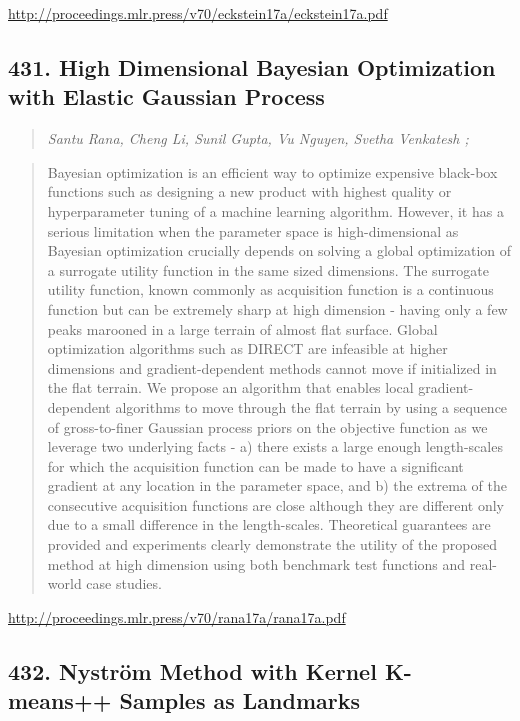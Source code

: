 \documentclass{article}
\begin{document}
\href{http://proceedings.mlr.press/v70/eckstein17a/eckstein17a.pdf}{http://proceedings.mlr.press/v70/eckstein17a/eckstein17a.pdf}

\subsection{431. High Dimensional Bayesian Optimization with Elastic Gaussian Process}

\begin{quote}
\footnotesize{\textit{Santu Rana, Cheng Li, Sunil Gupta, Vu Nguyen, Svetha Venkatesh ;}}
\end{quote}

\begin{quote}
    Bayesian optimization is an efficient way to optimize expensive black-box functions such as designing a new product with highest quality or hyperparameter tuning of a machine learning algorithm. However, it has a serious limitation when the parameter space is high-dimensional as Bayesian optimization crucially depends on solving a global optimization of a surrogate utility function in the same sized dimensions. The surrogate utility function, known commonly as acquisition function is a continuous function but can be extremely sharp at high dimension - having only a few peaks marooned in a large terrain of almost flat surface. Global optimization algorithms such as DIRECT are infeasible at higher dimensions and gradient-dependent methods cannot move if initialized in the flat terrain. We propose an algorithm that enables local gradient-dependent algorithms to move through the flat terrain by using a sequence of gross-to-finer Gaussian process priors on the objective function as we leverage two underlying facts - a) there exists a large enough length-scales for which the acquisition function can be made to have a significant gradient at any location in the parameter space, and b) the extrema of the consecutive acquisition functions are close although they are different only due to a small difference in the length-scales. Theoretical guarantees are provided and experiments clearly demonstrate the utility of the proposed method at high dimension using both benchmark test functions and real-world case studies.  \end{quote}

\href{http://proceedings.mlr.press/v70/rana17a/rana17a.pdf}{http://proceedings.mlr.press/v70/rana17a/rana17a.pdf}

\subsection{432. Nyström Method with Kernel K-means++ Samples as Landmarks}
\end{document}

